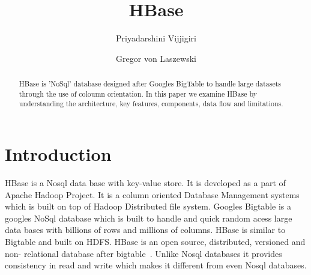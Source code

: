 
\title{HBase}


\author{Priyadarshini Vijjigiri}

\author{Gregor von Laszewski}


\renewcommand{\shortauthors}{G. v. Laszewski}


\begin{abstract}

HBase is 'NoSql' database designed after Googles BigTable to handle large datasets
through the use of coloumn orientation. In this paper we examine HBase by 
understanding the architecture, key features, components, data flow and limitations.

\end{abstract}


\maketitle

\section{Introduction}

HBase is a Nosql data base with key-value store. It is developed as a part of
Apache Hadoop Project. It is a column oriented Database Management systems which
is built on top of Hadoop Distributed file system. Googles Bigtable is a googles
NoSql database which is built to handle and quick random acess large data bases
with billions of rows and millions of columns. HBase is similar to Bigtable and
built on HDFS. HBase is an open source, distributed, versioned  and non-
relational database after bigtable~\cite {hid-sp18-421-HBase-intro}. Unlike
Nosql databases it provides consistency in read and write which makes it
different from even Nosql databases.

